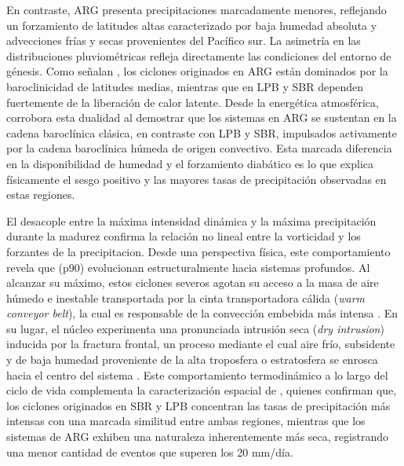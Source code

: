 En contraste, ARG presenta precipitaciones marcadamente menores, reflejando un forzamiento de latitudes altas caracterizado por baja humedad absoluta y advecciones frías y secas provenientes del Pacífico sur.
La asimetría en las distribuciones pluviométricas refleja directamente las condiciones del entorno de génesis. 
Como señalan \citet{gramcianinov2019properties}, los ciclones originados en ARG están dominados por la baroclinicidad de latitudes medias, mientras que en LPB y SBR dependen fuertemente de la liberación de calor latente. 
Desde la energética atmosférica, \citet{coutodesouza2024thesis} corrobora esta dualidad al demostrar que los sistemas en ARG se sustentan en la cadena baroclínica clásica, en contraste con LPB y SBR, impulsados activamente por la cadena baroclínica húmeda de origen convectivo. 
Esta marcada diferencia en la disponibilidad de humedad y el forzamiento diabático es lo que explica físicamente el sesgo positivo y las mayores tasas de precipitación observadas en estas regiones.

El desacople entre la máxima intensidad dinámica y la máxima precipitación durante la madurez confirma la relación no lineal entre la vorticidad y los forzantes de la precipitacion.
Desde una perspectiva física, este comportamiento revela que  (p90) evolucionan estructuralmente hacia sistemas profundos. 
Al alcanzar su máximo, estos ciclones severos agotan su acceso a la masa de aire húmedo e inestable transportada por la cinta transportadora cálida (\textit{warm conveyor belt}), la cual es responsable de la convección embebida más intensa \citep{oertel2021warm, blanchard2021warm}. 
En su lugar, el núcleo experimenta una pronunciada intrusión seca (\textit{dry intrusion}) inducida por la fractura frontal, un proceso mediante el cual aire frío, subsidente y de baja humedad proveniente de la alta troposfera o estratosfera se enrosca hacia el centro del sistema \citep{shapiro1999bridge}. 
Este comportamiento termodinámico a lo largo del ciclo de vida complementa la caracterización espacial de \citet{gramcianinov2019properties}, quienes confirman que, los ciclones originados en SBR y LPB concentran las tasas de precipitación más intensas con una marcada similitud entre ambas regiones, mientras que los sistemas de ARG exhiben una naturaleza inherentemente más seca, registrando una menor cantidad de eventos que superen los 20 mm/día.


